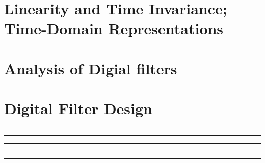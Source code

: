 \documentclass[10pt]{article}
\begin{document}
\newcommand{\josquote}[1]{
    \framebox{
    \parbox{\textwidth}{
    \textit{#1}
    }
    }
}

\newcommand{\paulhint}[1]{
    #1
}

\setlength\parindent{0pt}
\section{Linearity and Time Invariance; Time-Domain Representations}
%
%
%
%
%
\section{Analysis of Digial filters}
%
%
%
%
%
\section{Digital Filter Design}
%
%
%
%
%
%
%
\noindent\rule[0.5ex]{\linewidth}{0.5pt}

\noindent\rule[0.5ex]{\linewidth}{0.5pt}

\noindent\rule[0.5ex]{\linewidth}{0.5pt}

\noindent\rule[0.5ex]{\linewidth}{0.5pt}

\noindent\rule[0.5ex]{\linewidth}{0.5pt}

\end{document}

